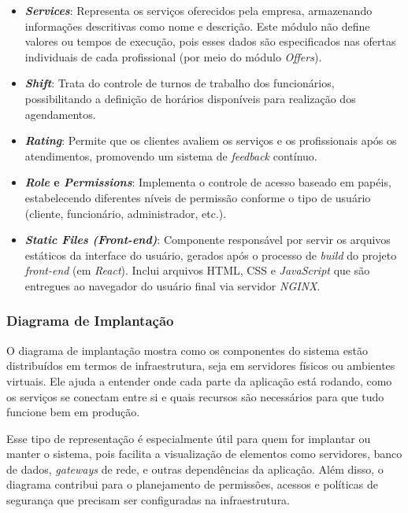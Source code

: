 \begin{itemize}
  \item \textbf{\emph{Services}}: Representa os serviços oferecidos pela empresa, armazenando informações descritivas como nome e descrição. Este módulo não define valores ou tempos de execução, pois esses dados são especificados nas ofertas individuais de cada profissional (por meio do módulo \textit{Offers}).

  \item \textbf{\emph{Shift}}: Trata do controle de turnos de trabalho dos funcionários, possibilitando a definição de horários disponíveis para realização dos agendamentos.

  \item \textbf{\emph{Rating}}: Permite que os clientes avaliem os serviços e os profissionais após os atendimentos, promovendo um sistema de \emph{feedback} contínuo.
  
  \item \textbf{\emph{Role} e \emph{Permissions}}: Implementa o controle de acesso baseado em papéis, estabelecendo diferentes níveis de permissão conforme o tipo de usuário (cliente, funcionário, administrador, etc.).

  \item \textbf{\emph{Static Files (Front-end)}}: Componente responsável por servir os arquivos estáticos da interface do usuário, gerados após o processo de \textit{build} do projeto \emph{front-end} (em \emph{React}). Inclui arquivos HTML, CSS e \emph{JavaScript} que são entregues ao navegador do usuário final via servidor \emph{NGINX}.
\end{itemize}

\subsubsection{Diagrama de Implantação}

O diagrama de implantação mostra como os componentes do sistema estão distribuídos em termos de infraestrutura, seja em servidores físicos ou ambientes virtuais. Ele ajuda a entender onde cada parte da aplicação está rodando, como os serviços se conectam entre si e quais recursos são necessários para que tudo funcione bem em produção.

Esse tipo de representação é especialmente útil para quem for implantar ou manter o sistema, pois facilita a visualização de elementos como servidores, banco de dados, \emph{gateways} de rede, e outras dependências da aplicação. Além disso, o diagrama contribui para o planejamento de permissões, acessos e políticas de segurança que precisam ser configuradas na infraestrutura.

